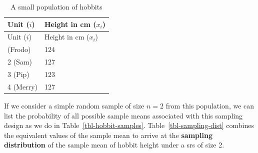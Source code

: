 \documentclass[
  13pt,
  letterpaper,
  DIV=11,
  numbers=noendperiod]{scrreprt}
\theoremstyle{plain}
\theoremstyle{plain}
\theoremstyle{definition}
\theoremstyle{definition}
\theoremstyle{remark}
\begin{document}
\begin{longtable}[]{@{}ll@{}}
\caption{A small population of
hobbits}\label{tbl-hobbit-pop}\tabularnewline
\toprule\noalign{}
Unit (\(i\)) & Height in cm (\(x_i\)) \\
\midrule\noalign{}
\endfirsthead
\toprule\noalign{}
Unit (\(i\)) & Height in cm (\(x_i\)) \\
\midrule\noalign{}
\endhead
\bottomrule\noalign{}
\endlastfoot
1 (Frodo) & 124 \\
2 (Sam) & 127 \\
3 (Pip) & 123 \\
4 (Merry) & 127 \\
\end{longtable}

If we consider a simple random sample of size \(n=2\) from this
population, we can list the probability of all possible sample means
associated with this sampling design as we do in
Table~\ref{tbl-hobbit-samples}. Table~\ref{tbl-sampling-dist} combines
the equivalent values of the sample mean to arrive at the
\textbf{sampling distribution} of the sample mean of hobbit height under
a srs of size 2.
\end{document}
